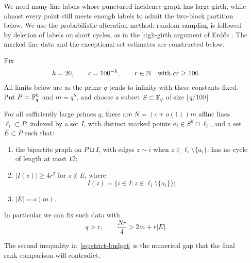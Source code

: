 We need many line labels whose punctured incidence graph has large girth,
while almost every point still meets enough labels to admit the two-block
partition below. We use the probabilistic alteration method: random
sampling is followed by deletion of labels on short cycles, as in the
high-girth argument of Erd\H{o}s \cite[pp.~35--37]{Erdos1959}. The marked
line data and the exceptional-set estimates are constructed below.

Fix
\begin{equation}\label{eq:fixed-parameters}
 h=20,\qquad c=100^{-h},\qquad r\in\mathbb N\quad\text{with }cr\ge100.
\end{equation}
All limits below are as the prime $q$ tends to infinity with these constants fixed. Put $P=\mathbb F_q^h$ and $m=q^h$, and choose a subset $S\subset\mathbb F_q$ of size $\lfloor q/100\rfloor$.

\begin{lemma}\label{lem:incidence}
For all sufficiently large primes $q$, there are $N=(c+o(1))m$ affine lines $\ell_i\subset P$, indexed by a set $I$, with distinct marked points $a_i\in S^h\cap\ell_i$, and a set $E\subset P$ such that:
\begin{enumerate}[label=\textup{(\roman*)}]
\item the bipartite graph on $P\sqcup I$, with edges $z\sim i$ when $z\in\ell_i\setminus\{a_i\}$, has no cycle of length at most $12$;
\item $|I(z)|\ge4r^2$ for $z\notin E$, where
\[
 I(z)=\{i\in I:z\in\ell_i\setminus\{a_i\}\};
\]
\item $|E|=o(m)$.
\end{enumerate}
In particular we can fix such data with
\begin{equation}\label{eq:strict-budget}
 q>r,\qquad \frac{Nr}{4}>2m+r|E|.
\end{equation}
\end{lemma}

The second inequality in~\eqref{eq:strict-budget} is the numerical gap
that the final rank comparison will contradict.

